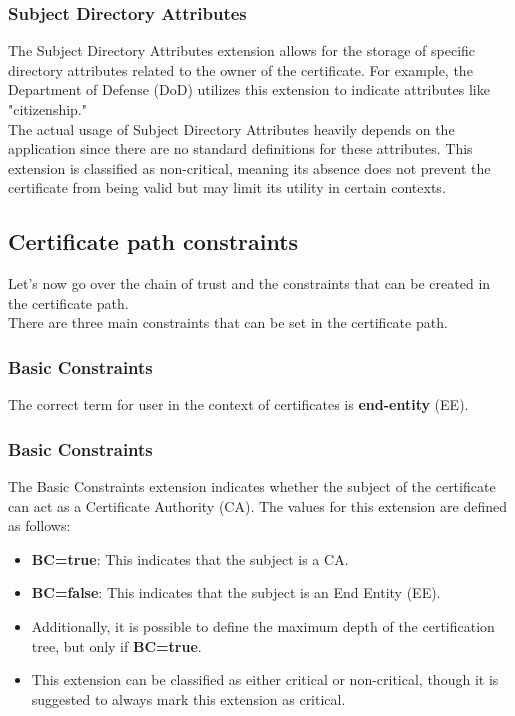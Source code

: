 \subsubsection{Subject Directory Attributes}

The Subject Directory Attributes extension allows for the storage of
specific directory attributes related to the owner of the certificate.
For example, the Department of Defense (DoD) utilizes this extension
to indicate attributes like "citizenship." \\
The actual usage of Subject Directory Attributes heavily depends on 
the application since there are no standard definitions for these 
attributes. This extension is classified as non-critical, meaning 
its absence does not prevent the certificate from being valid but 
may limit its utility in certain contexts.

\subsection{Certificate path constraints}
Let's now go over the chain of trust and the constraints that can be 
created in the certificate path.\\
There are three main constraints that can be set in the certificate 
path.
\subsubsection{Basic Constraints}

\begin{boxH}
  The correct term for user in the context of certificates is
  \textbf{end-entity} (EE).
\end{boxH}

\subsubsection{Basic Constraints}

The Basic Constraints extension indicates whether the subject of 
the certificate can act as a Certificate Authority (CA). The 
values for this extension are defined as follows: 

\begin{itemize}
    \item \textbf{BC=true}: This indicates that the subject 
    is a CA.
    \item \textbf{BC=false}: This indicates that the subject 
    is an End Entity (EE).
    \item Additionally, it is possible to define the maximum 
    depth of the certification tree, but only if 
    \textbf{BC=true}.
    \item This extension can be classified as either 
    critical or non-critical, though it is suggested to 
    always mark this extension as critical.
\end{itemize}


